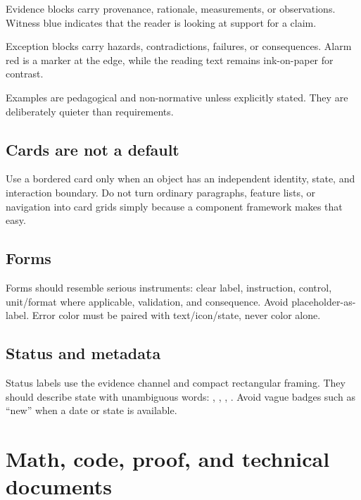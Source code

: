 \documentclass[11pt,twoside,openany]{report}
\begin{document}
\begin{evidencebox}
Evidence blocks carry provenance, rationale, measurements, or observations. Witness blue indicates that the reader is looking at support for a claim.
\end{evidencebox}

\begin{alarmbox}
Exception blocks carry hazards, contradictions, failures, or consequences. Alarm red is a marker at the edge, while the reading text remains ink-on-paper for contrast.
\end{alarmbox}

\begin{examplebox}
Examples are pedagogical and non-normative unless explicitly stated. They are deliberately quieter than requirements.
\end{examplebox}

\section{Cards are not a default}
Use a bordered card only when an object has an independent identity, state, and interaction boundary. Do not turn ordinary paragraphs, feature lists, or navigation into card grids simply because a component framework makes that easy.

\section{Forms}
Forms should resemble serious instruments: clear label, instruction, control, unit/format where applicable, validation, and consequence. Avoid placeholder-as-label. Error color must be paired with text/icon/state, never color alone.

\section{Status and metadata}
Status labels use the evidence channel and compact rectangular framing. They should describe state with unambiguous words: , , , . Avoid vague badges such as ``new'' when a date or state is available.

\clearpage
\chapter{Math, code, proof, and technical documents}
\end{document}
